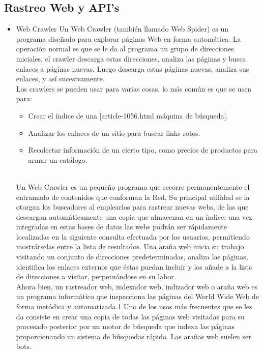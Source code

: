 	\subsection{Rastreo Web y API's}
	\begin{itemize}
		\item Web Crawler\newline
			Un Web Crawler (también llamado Web Spider) es un programa diseñado para explorar páginas Web en forma automática. La operación normal es que se le da al programa un grupo de direcciones iniciales, el crawler descarga estas direcciones, analiza las páginas y busca enlaces a páginas nuevas. Luego descarga estas páginas nuevas, analiza sus enlaces, y así sucesivamente.\cite{crawling} \\
			Los crawlers se pueden usar para varias cosas, lo más común es que se usen para:
				\begin{itemize}
					\item Crear el índice de una [article-1056.html máquina de búsqueda]. 
					\item Analizar los enlaces de un sitio para buscar links rotos. 
					\item Recolectar información de un cierto tipo, como precios de productos para armar un catálogo. \cite{craw}
				\end{itemize} \\
			
			Un Web Crawler es un pequeño programa que recorre permanentemente el entramado de contenidos que conforman la Red. Su principal utilidad se la otorgan los buscadores al emplearlos para rastrear nuevas webs, de las que descargan automáticamente una copia que almacenan en un índice; una vez integradas en estas bases de datos las webs podrán ser rápidamente localizadas en la siguiente consulta efectuada por los usuarios, permitiendo mostrárselas entre la lista de resultados.
			Una araña web inicia su trabajo visitando un conjunto de direcciones predeterminadas, analiza las páginas, identifica los enlaces externos que éstas puedan incluir y los añade a la lista de direcciones a visitar, perpetuándose en su labor.	\cite{web} \\
			
			Ahora bien, un rastreador web, indexador web, indizador web o araña web es un programa informático que inspecciona las páginas del World Wide Web de forma metódica y automatizada.1 Uno de los usos más frecuentes que se les da consiste en crear una copia de todas las páginas web visitadas para su procesado posterior por un motor de búsqueda que indexa las páginas proporcionando un sistema de búsquedas rápido. Las arañas web suelen ser bots. \cite{araña} \\
			

\end{itemize}
